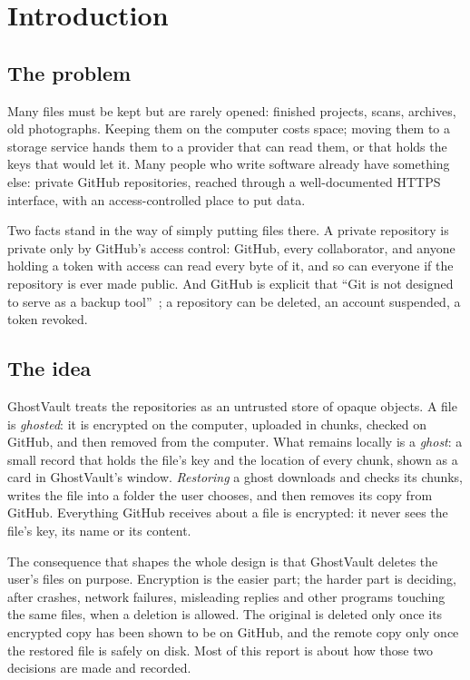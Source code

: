 \section{Introduction}\label{sec:intro}

\subsection{The problem}
Many files must be kept but are rarely opened: finished projects, scans, archives, old
photographs. Keeping them on the computer costs space; moving them to a storage service hands
them to a provider that can read them, or that holds the keys that would let it. Many people who
write software already have something else: private GitHub repositories, reached through a
well-documented HTTPS interface, with an access-controlled place to put data.

Two facts stand in the way of simply putting files there. A private repository is private only
by GitHub's access control: GitHub, every collaborator, and anyone holding a token with access
can read every byte of it, and so can everyone if the repository is ever made public. And GitHub
is explicit that ``Git is not designed to serve as a backup tool''~\cite{gh-large}; a repository
can be deleted, an account suspended, a token revoked.

\subsection{The idea}
GhostVault treats the repositories as an untrusted store of opaque objects. A file is
\emph{ghosted}: it is encrypted on the computer, uploaded in chunks, checked on GitHub, and then
removed from the computer. What remains locally is a \emph{ghost}: a small record that holds the
file's key and the location of every chunk, shown as a card in GhostVault's window.
\emph{Restoring} a ghost downloads and checks its chunks, writes the file into a folder the user
chooses, and then removes its copy from GitHub. Everything GitHub receives about a file is
encrypted: it never sees the file's key, its name or its content.

The consequence that shapes the whole design is that GhostVault deletes the user's files on
purpose. Encryption is the easier part; the harder part is deciding, after crashes, network
failures, misleading replies and other programs touching the same files, when a deletion is
allowed. The original is deleted only once its encrypted copy has been shown to be on GitHub, and
the remote copy only once the restored file is safely on disk. Most of this report is about how
those two decisions are made and recorded.

